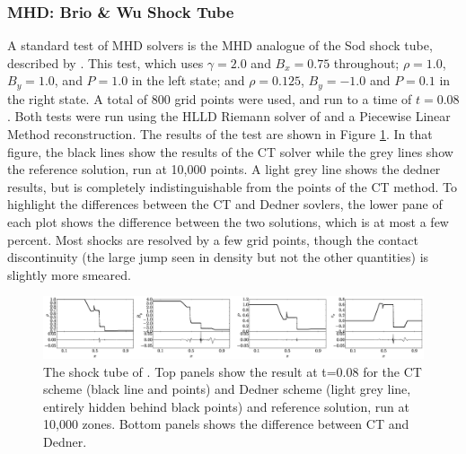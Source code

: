 \subsubsection{MHD: Brio \& Wu Shock Tube}
\label{sec.tests.bw}

A standard test of MHD solvers is the MHD analogue of the Sod shock tube,
described by \citet{Brio88}.   This test, which uses $\gamma=2.0$ and $B_x=0.75$
throughout; $\rho=1.0$, $B_y=1.0$, and $P=1.0$ in the left state; and $\rho=0.125$,
$B_y=-1.0$ and $P=0.1$ in the right state.  A total of 800 grid points were
used, and run to a time of $t=0.08$.  Both tests were run using the HLLD Riemann
solver of \citet{Miyoshi05} and a Piecewise Linear Method reconstruction.  The
results of the test are shown in Figure \ref{fig.brio}.  In that figure, the
black lines show the results of the CT solver while the grey lines show the
reference solution, run at 10,000 points.  A light grey line shows the dedner
results, but is completely indistinguishable from the points of the CT method.
To highlight the differences between the CT and Dedner sovlers, 
the lower pane of each plot shows the difference between the two solutions,
which is at most a few percent.   Most shocks are resolved by a few grid points,
though the contact discontinuity (the large jump seen in density but not
the other quantities) is slightly more smeared.

\begin{figure}
\begin{center}
\includegraphics[width=1\textwidth]{figures/bw.eps}
\caption{The shock tube of \citet{Brio88}.  Top panels show the result at
t=0.08
for the CT scheme (black line and points) and Dedner scheme (light grey line,
entirely hidden behind black points) and reference solution, run at 10,000
zones.  Bottom panels
shows the difference between CT and Dedner.}
\label{fig.brio}
\end{center}
\end{figure}

